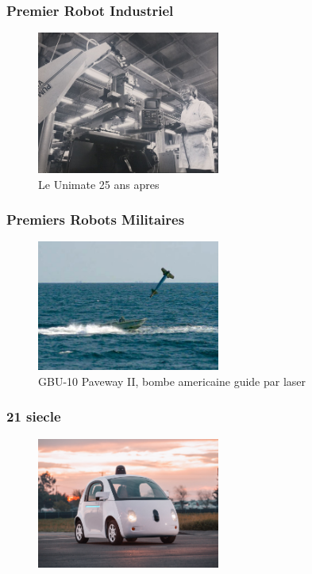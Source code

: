 \documentclass{beamer}
\begin{document}
\begin{frame}
 \frametitle{Premier Robot Industriel}
  \begin{figure}[!h]
  \centering
  \includegraphics[width=6cm]{pumo2.jpg}
  \caption{Le Unimate 25 ans apres}
  \end{figure}
\end{frame}

\begin{frame}
  \frametitle{Premiers Robots Militaires}
  
  \begin{figure}[!h]
  \centering
  \includegraphics[width=6cm]{1280px-GBU-10_shortly_before_it_impacts_a_small_boat_during_a_training_exercise.jpg}
  \caption{GBU-10 Paveway II, bombe americaine guide par laser}
  \end{figure}
  
\end{frame}

\begin{frame}
  \frametitle{21 siecle}
  \begin{figure}[!h]
  \centering
  \includegraphics[width=6cm]{google-artificial-intelligence-first-non-human-driver_dezeen_1568_1.jpg}
  
  \end{figure}
\end{frame}
\end{document}
